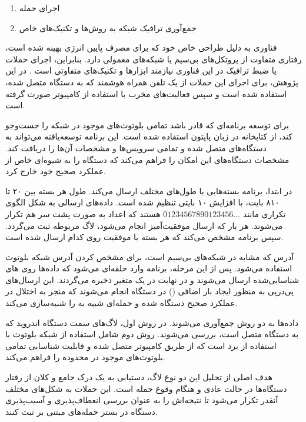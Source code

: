 \begin{enumerate}
    \item اجرای حمله
    \item جمع‌آوری ترافیک شبکه به روش‌ها و تکنیک‌های خاص
\end{enumerate}

فناوری  به دلیل طراحی خاص خود که برای مصرف پایین انرژی بهینه شده است،
رفتاری متفاوت از پروتکل‌های بی‌سیم یا شبکه‌های معمولی دارد. بنابراین، اجرای
حملات یا ضبط ترافیک در این فناوری نیازمند ابزارها و تکنیک‌های متفاوتی است
\cite{matHackingTheBLE}. در این پژوهش، برای اجرای این حملات از یک تلفن همراه
هوشمند که به دستگاه  متصل شده، استفاده شده است و سپس فعالیت‌های مخرب با
استفاده از کامپیوتر صورت گرفته است.

برای توسعه برنامه‌ای که قادر باشد تمامی بلوتوث‌های موجود در شبکه را جست‌وجو کند،
از کتابخانه  در زبان پایتون استفاده شده است. این برنامه توسعه‌یافته
می‌تواند به دستگاه‌های  متصل شده و تمامی سرویس‌ها و مشخصات آن‌ها را
دریافت کند. مشخصات دستگاه‌های  این امکان را فراهم می‌کند که دستگاه را
به شیوه‌ای خاص از عملکرد صحیح خود خارج کرد.

در ابتدا، برنامه بسته‌هایی با طول‌های مختلف ارسال می‌کند. طول هر بسته بین ۲۰ تا
۸۱۰ بایت، با افزایش ۱۰ بایتی تنظیم شده است. داده‌های ارسالی به شکل الگوی تکراری
مانند $01234567890123456\ldots$ هستند که اعداد به صورت پشت سر هم تکرار می‌شوند.
هر بار که ارسال موفقیت‌آمیز انجام می‌شود، لاگ مربوطه ثبت می‌گردد. سپس برنامه
مشخص می‌کند که هر بسته با موفقیت روی کدام  ارسال شده است.

آدرس  که مشابه  در شبکه‌های بی‌سیم  است، برای مشخص
کردن آدرس شبکه بلوتوث استفاده می‌شود. پس از این مرحله، برنامه وارد حلقه‌ای
می‌شود که داده‌ها روی های شناسایی‌شده ارسال می‌شوند و در نهایت در یک
متغیر ذخیره می‌گردند. این ارسال‌های پی‌درپی به منظور ایجاد بار اضافی
() در دستگاه انجام می‌شوند که منجر به اختلال در عملکرد صحیح دستگاه
شده و حمله‌ای شبیه به  را شبیه‌سازی می‌کند.

داده‌ها به دو روش جمع‌آوری می‌شوند. در روش اول، لاگ‌های سمت دستگاه اندروید که به
دستگاه  متصل است، بررسی می‌شوند. روش دوم شامل استفاده از  شبکه
بلوتوث با استفاده از برد  است که از طریق کامپیوتر متصل شده و
قابلیت شناسایی تمامی بلوتوث‌های موجود در محدوده را فراهم می‌کند.

هدف اصلی از تحلیل این دو نوع لاگ، دستیابی به یک درک جامع و کلان از رفتار
دستگاه‌ها در حالت عادی و هنگام وقوع حمله است. این حملات به شکل‌های مختلف آنقدر
تکرار می‌شود تا نتیجه‌اش را به عنوان بررسی انعطاف‌پذیری و آسیب‌پذیری دستگاه در
بستر حمله‌های مبتنی بر  ثبت کنند.

